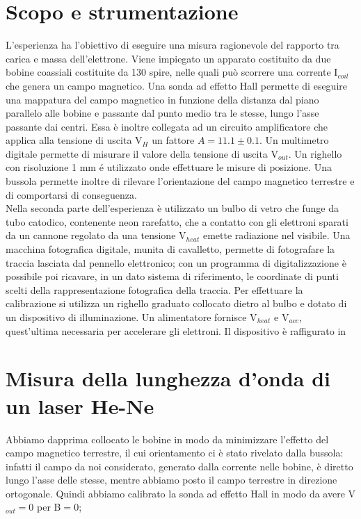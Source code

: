 \section{Scopo e strumentazione}

L'esperienza ha l'obiettivo di eseguire una misura ragionevole del rapporto tra carica e massa dell'elettrone. Viene impiegato un apparato costituito da due bobine coassiali costituite da 130 spire, nelle quali può scorrere una corrente I$_{coil}$ che genera un campo magnetico. Una sonda ad effetto Hall permette di eseguire una mappatura del campo magnetico in funzione della distanza dal piano parallelo alle bobine e passante dal punto medio tra le stesse, lungo l'asse passante dai centri. Essa è inoltre collegata ad un circuito amplificatore che applica alla tensione di uscita V$_H$ un fattore $A = 11.1 \pm 0.1$. Un multimetro digitale permette di misurare il valore della tensione di uscita V$_{out}$. Un righello con risoluzione 1 mm é utilizzato onde effettuare le misure di posizione. Una bussola permette inoltre di rilevare l'orientazione del campo magnetico terrestre e di comportarsi di conseguenza.\\ Nella seconda parte dell'esperienza è utilizzato un bulbo di vetro che funge da tubo catodico, contenente neon rarefatto, che a contatto con gli elettroni sparati da un cannone regolato da una tensione V$_{heat }$ emette radiazione nel visibile. Una macchina fotografica digitale, munita di cavalletto, permette di fotografare la traccia lasciata dal pennello elettronico; con un programma di digitalizzazione è possibile poi ricavare, in un dato sistema di riferimento, le coordinate di punti scelti della rappresentazione fotografica della traccia. Per effettuare la calibrazione si utilizza un righello graduato collocato dietro al bulbo e dotato di un dispositivo di illuminazione. Un alimentatore fornisce V$_{heat}$ e V$_{acc}$, quest'ultima necessaria per accelerare gli elettroni. Il dispositivo è raffigurato in \fig
\section{Misura della lunghezza d'onda di un laser He-Ne}

Abbiamo dapprima collocato le bobine in modo da minimizzare l'effetto del campo magnetico terrestre, il cui orientamento ci è stato rivelato dalla bussola: infatti il campo da noi considerato, generato dalla corrente nelle bobine, è diretto lungo l'asse delle stesse, mentre abbiamo posto il campo terrestre in direzione ortogonale. Quindi abbiamo calibrato la sonda ad effetto Hall in modo da avere V$_{out}=0$ per B$=0$;

